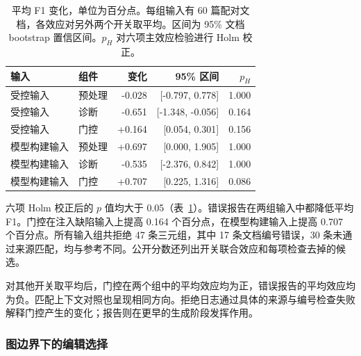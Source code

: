 \begin{table}[t]

\centering

\caption{平均 F1 变化，单位为百分点。每组输入有 60 篇配对文档，各效应对另外两个开关取平均。区间为 95\% 文档 bootstrap 置信区间。$p_H$ 对六项主效应检验进行 Holm 校正。}
\label{tab:recovery_factorial}

\small

\begin{tabular}{llrrr}

\toprule

输入 & 组件 & 变化 & 95\% 区间 & $p_H$ \\

\midrule

受控输入 & 预处理 & -0.028 & [-0.797, 0.778] & 1.000 \\

受控输入 & 诊断 & -0.651 & [-1.348, -0.056] & 0.164 \\

受控输入 & 门控 & +0.164 & [0.054, 0.301] & 0.156 \\

模型构建输入 & 预处理 & +0.697 & [0.000, 1.905] & 1.000 \\

模型构建输入 & 诊断 & -0.535 & [-2.376, 0.842] & 1.000 \\

模型构建输入 & 门控 & +0.707 & [0.225, 1.316] & 0.086 \\

\bottomrule

\end{tabular}

\end{table}

六项 Holm 校正后的 $p$ 值均大于 0.05（表~\ref{tab:recovery_factorial}）。错误报告在两组输入中都降低平均 F1。门控在注入缺陷输入上提高 0.164 个百分点，在模型构建输入上提高 0.707 个百分点。所有输入组共拒绝 47 条三元组，其中 17 条文档编号错误，30 条未通过来源匹配，均与参考不同。公开分数还列出开关联合效应和每项检查去掉的候选。

对其他开关取平均后，门控在两个组中的平均效应均为正，错误报告的平均效应均为负。匹配上下文对照也呈现相同方向。拒绝日志通过具体的来源与编号检查失败解释门控产生的变化；报告则在更早的生成阶段发挥作用。

\subsubsection{图边界下的编辑选择}

